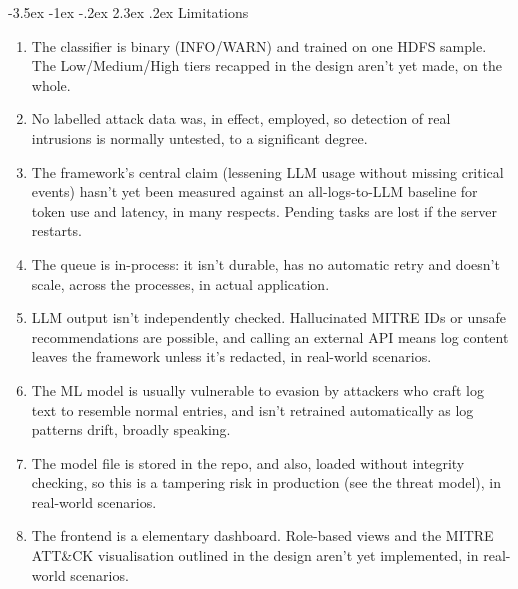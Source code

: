 \documentclass[12pt,a4paper]{report}
\makeatletter
\renewcommand\section{\@startsection {section}{1}{\z@}%
  {-3.5ex \@plus -1ex \@minus -.2ex}%
  {2.3ex \@plus .2ex}%
  {\normalfont\fontsize{17}{21}\selectfont\bfseries}}
\makeatother
\begin{document}
\section{Limitations}
\begin{enumerate}[label=\arabic*.]
  \item The classifier is binary (INFO/WARN) and trained on one HDFS sample. The Low/Medium/High tiers recapped in the design aren't yet made, on the whole.
  \item No labelled attack data was, in effect, employed, so detection of real intrusions is normally untested, to a significant degree.
  \item The framework's central claim (lessening LLM usage without missing critical events) hasn't yet been measured against an all-logs-to-LLM baseline for token use and latency, in many respects.
  Pending tasks are lost if the server restarts. \item The queue is in-process: it isn't durable, has no automatic retry and doesn't scale, across the processes, in actual application.
  \item LLM output isn't independently checked. Hallucinated MITRE IDs or unsafe recommendations are possible, and calling an external API means log content leaves the framework unless it's redacted, in real-world scenarios.
  \item The ML model is usually vulnerable to evasion by attackers who craft log text to resemble normal entries, and isn't retrained automatically as log patterns drift, broadly speaking.
  \item The model file is stored in the repo, and also, loaded without integrity checking, so this is a tampering risk in production (see the threat model), in real-world scenarios.
  \item The frontend is a elementary dashboard. Role-based views and the MITRE ATT\&CK visualisation outlined in the design aren't yet implemented, in real-world scenarios.
\end{enumerate}
\end{document}
